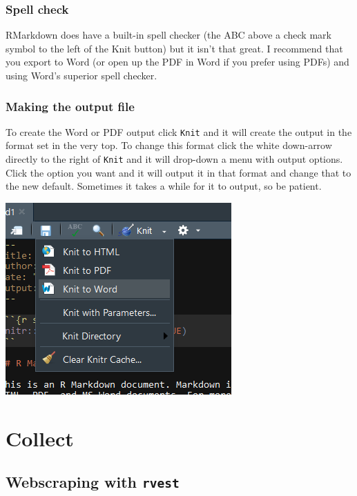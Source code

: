 \documentclass[
  12pt,
  openany]{book}
\begin{document}
\hypertarget{spell-check}{%
\section{Spell check}\label{spell-check}}

RMarkdown does have a built-in spell checker (the ABC above a check mark symbol to the left of the Knit button) but it isn't that great. I recommend that you export to Word (or open up the PDF in Word if you prefer using PDFs) and using Word's superior spell checker.

\hypertarget{making-the-output-file}{%
\section{Making the output file}\label{making-the-output-file}}

To create the Word or PDF output click \texttt{Knit} and it will create the output in the format set in the very top. To change this format click the white down-arrow directly to the right of \texttt{Knit} and it will drop-down a menu with output options. Click the option you want and it will output it in that format and change that to the new default. Sometimes it takes a while for it to output, so be patient.

\includegraphics{images/markdown4.PNG}

\hypertarget{part-collect}{%
\part{Collect}\label{part-collect}}

\hypertarget{webscraping-with-rvest}{%
\chapter{\texorpdfstring{Webscraping with \texttt{rvest}}{Webscraping with rvest}}\label{webscraping-with-rvest}}
\end{document}

